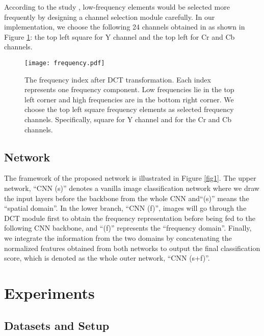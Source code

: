 \documentclass[10pt, conference, compsocconf]{IEEEtran}
\begin{document}
According to the study \cite{XuKai2020}, low-frequency elements would be selected more frequently by designing a channel selection module carefully. In our implementation, we choose the following 24 channels {}{obtained in} \cite{XuKai2020} as shown in Figure \ref{fig3}: the top left  square for Y channel and the top left  for Cr and Cb channels.

\begin{figure}[t]
\begin{center}
    \texttt{[image: frequency.pdf]}\end{center}
\caption{The  frequency index after DCT transformation. Each index represents one frequency component. Low frequencies lie in the top left corner and high frequencies are in the bottom right corner. We choose the top left square frequency elements as selected frequency channels. Specifically,  square for Y channel and  for the Cr and Cb channels. }
\label{fig3}
\end{figure}

\subsection{Network}

The framework of the proposed network is illustrated in Figure \ref{fig1}. The upper network, \enquote{CNN (s)} denotes a vanilla image classification network where we draw the input layers before the backbone from the whole CNN and\enquote{(s)} means the \enquote{spatial domain}. In the lower branch, \enquote{CNN (f)}, images will go through the DCT module first to obtain the frequency representation before being fed to the following CNN backbone, and \enquote{(f)} represents the \enquote{frequency domain}. Finally, we integrate the information from the two domains by concatenating the {}{normalized} features obtained from both networks to output the final classification score, which is denoted as the whole outer network, \enquote{CNN (s+f)}. 

\section{Experiments}

\subsection{Datasets and Setup} 
\end{document}
